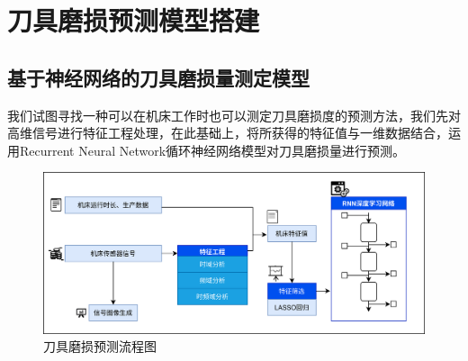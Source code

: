 \chapter{刀具磨损预测模型搭建}
% 
% 
% 
% 
\section{基于神经网络的刀具磨损量测定模型}
我们试图寻找一种可以在机床工作时也可以测定刀具磨损度的预测方法，我们先对高维信号进行特征工程处理，在此基础上，将所获得的特征值与一维数据结合，运用Recurrent Neural Network循环神经网络模型对刀具磨损量进行预测。\par
% 
\begin{figure}[htp]
    \centering
    \includegraphics[width=14cm]{Chapter2/RNN测定模型.png}
    \caption{刀具磨损预测流程图}
\end{figure}
% 
